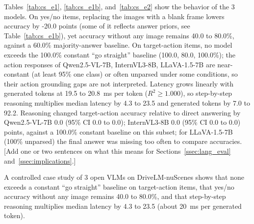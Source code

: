 Tables~\ref{tab:cs_e1}, \ref{tab:cs_e1b}, and~\ref{tab:cs_e2} show the behavior of the 3 models. On yes/no items, replacing the images with a blank frame lowers accuracy by -20.0 points (some of it reflects answer priors, see Table~\ref{tab:cs_e1b}), yet accuracy without any image remains 40.0 to 80.0\%, against a 60.0\% majority-answer baseline. On target-action items, no model exceeds the 100.0\% constant ``go straight'' baseline (100.0, 80.0, 100.0\%); the action responses of Qwen2.5-VL-7B, InternVL3-8B, LLaVA-1.5-7B are near-constant (at least 95\% one class) or often unparsed under some conditions, so their action grounding gaps are not interpreted. Latency grows linearly with generated tokens at 19.5 to 20.8~ms per token ($R^2\ge1.000$), so step-by-step reasoning multiplies median latency by 4.3 to 23.5 and generated tokens by 7.0 to 92.2. Reasoning changed target-action accuracy relative to direct answering by Qwen2.5-VL-7B 0.0 (95\% CI 0.0 to 0.0); InternVL3-8B 0.0 (95\% CI 0.0 to 0.0) points, against a 100.0\% constant baseline on this subset; for LLaVA-1.5-7B (100\% unparsed) the final answer was missing too often to compare accuracies. [Add one or two sentences on what this means for Sections~\ref{ssec:lang_eval} and~\ref{ssec:implications}.]

A controlled case study of 3 open VLMs on DriveLM-nuScenes shows that none exceeds a constant ``go straight'' baseline on target-action items, that yes/no accuracy without any image remains 40.0 to 80.0\%, and that step-by-step reasoning multiplies median latency by 4.3 to 23.5 (about 20~ms per generated token).
